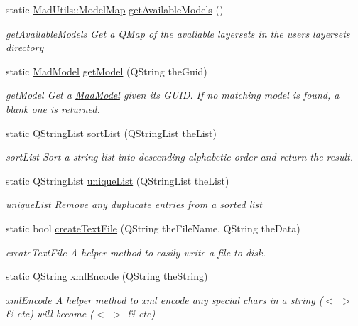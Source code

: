\begin{DoxyCompactItemize}
static \hyperlink{class_mad_utils_a6bec5016d103cb2712d7bd2001c55b3b}{Mad\-Utils\-::\-Model\-Map} \hyperlink{class_mad_utils_ac4ada50d41fccd2f0782c669721165c6}{get\-Available\-Models} ()
\begin{DoxyCompactList}\small\item\em get\-Available\-Models Get a Q\-Map of the avaliable layersets in the users layersets directory \end{DoxyCompactList}\item 
static \hyperlink{class_mad_model}{Mad\-Model} \hyperlink{class_mad_utils_a25b56990e934963c77f010382c92747c}{get\-Model} (Q\-String the\-Guid)
\begin{DoxyCompactList}\small\item\em get\-Model Get a \hyperlink{class_mad_model}{Mad\-Model} given its G\-U\-I\-D. If no matching model is found, a blank one is returned. \end{DoxyCompactList}\item 
static Q\-String\-List \hyperlink{class_mad_utils_a7b39b00a2403f195eee4fc4e510db90b}{sort\-List} (Q\-String\-List the\-List)
\begin{DoxyCompactList}\small\item\em sort\-List Sort a string list into descending alphabetic order and return the result. \end{DoxyCompactList}\item 
static Q\-String\-List \hyperlink{class_mad_utils_a95cfacb1aabb5fd8085933ee9cabb5de}{unique\-List} (Q\-String\-List the\-List)
\begin{DoxyCompactList}\small\item\em unique\-List Remove any duplucate entries from a sorted list \end{DoxyCompactList}\item 
static bool \hyperlink{class_mad_utils_a548aac989563c538ad9695e10845e3ab}{create\-Text\-File} (Q\-String the\-File\-Name, Q\-String the\-Data)
\begin{DoxyCompactList}\small\item\em create\-Text\-File A helper method to easily write a file to disk. \end{DoxyCompactList}\item 
static Q\-String \hyperlink{class_mad_utils_ae6d98beebaf217ce2d630644412eabf2}{xml\-Encode} (Q\-String the\-String)
\begin{DoxyCompactList}\small\item\em xml\-Encode A helper method to xml encode any special chars in a string ($<$ $>$ \& etc) will become ($<$ $>$ \& etc) \end{DoxyCompactList}\item 

\end{DoxyCompactItemize}
